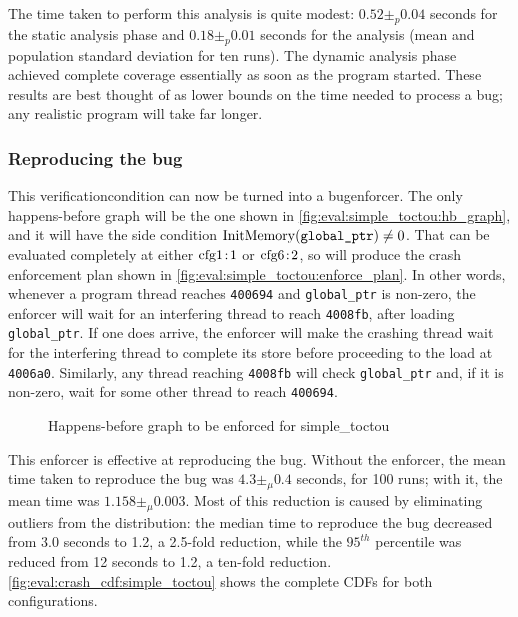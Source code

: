 The time taken to perform this analysis is quite modest: $0.52 \pm_p
0.04$ seconds for the static analysis phase and $0.18 \pm_p 0.01$
seconds for the {\StateMachine} analysis (mean and population standard
deviation for ten runs).  The dynamic analysis phase achieved complete
coverage essentially as soon as the program started.  These results
are best thought of as lower bounds on the time needed to process a
bug; any realistic program will take far longer.

\subsubsection{Reproducing the bug}
This \gls{verificationcondition} can now be turned into a
\gls{bugenforcer}.  The only happens-before graph will be the one
shown in \autoref{fig:eval:simple_toctou:hb_graph}, and it will have
the side condition $\mathrm{InitMemory}(\texttt{global\_ptr}) \not= 0$.  That can
be evaluated completely at either $\mathrm{cfg1}\!:\!\mathrm{1}$ or $\mathrm{cfg6}\!:\!\mathrm{2}$,
so {\technique} will produce the crash enforcement plan shown in
\autoref{fig:eval:simple_toctou:enforce_plan}.  In other words,
whenever a program thread reaches \texttt{400694} and
\texttt{global\_ptr} is non-zero, the enforcer will wait for an
interfering thread to reach \texttt{4008fb}, after loading
\texttt{global\_ptr}.  If one does arrive, the enforcer will make the
crashing thread wait for the interfering thread to complete its store
before proceeding to the load at \texttt{4006a0}.  Similarly, any
thread reaching \texttt{4008fb} will check \texttt{global\_ptr} and, if
it is non-zero, wait for some other thread to reach \texttt{400694}.

\begin{wrapfigure}{r}{7cm}
  \caption{Happens-before graph to be enforced for simple\_toctou}
  \label{fig:eval:simple_toctou:hb_graph}
\end{wrapfigure}
This enforcer is effective at reproducing the bug.  Without the
enforcer, the mean time taken to reproduce the bug was $4.3 \pm_\mu
0.4$ seconds, for 100 runs; with it, the mean time was $1.158 \pm_\mu
0.003$.  Most of this reduction is caused by eliminating outliers from
the distribution: the median time to reproduce the bug decreased from
3.0 seconds to 1.2, a 2.5-fold reduction, while the $95^{th}$
percentile was reduced from 12 seconds to 1.2, a ten-fold reduction.
\autoref{fig:eval:crash_cdf:simple_toctou} shows the complete CDFs
for both configurations.

